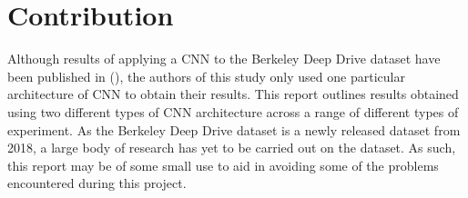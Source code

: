 \documentclass[12pt]{report}
\begin{document}
\section{Contribution}
\begin{flushleft}
Although results of applying a CNN to the Berkeley Deep Drive dataset have been published in (\cite{yu2018bdd100k}), the authors of this study only used one particular architecture of CNN to obtain their results. This report outlines results obtained using two different types of CNN architecture across a range of different types of experiment. As the Berkeley Deep Drive dataset is a newly released dataset from 2018, a large body of research has yet  to be carried out on the dataset. As such, this report may be of some small use to aid in avoiding some of the problems encountered during this project.
\end{flushleft}
\end{document}
